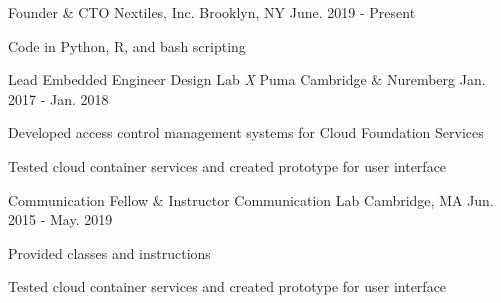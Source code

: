 

\begin{cventries}

\cventry
    {Founder \& CTO} %
    {Nextiles, Inc.} %
    {Brooklyn, NY} %
    {June. 2019 - Present} %
    {
      \begin{cvitems} %
        \item {}
        \item {Code in Python, R, and bash scripting}
      \end{cvitems}
    }

 \cventry
    {Lead Embedded Engineer} %
    {Design Lab \textit{X} Puma} %
    {Cambridge \& Nuremberg} %
    {Jan. 2017 - Jan. 2018} %
    {
      \begin{cvitems} %
        \item {Developed access control management systems for Cloud Foundation Services}
        \item {Tested cloud container services and created prototype for user interface}
      \end{cvitems}
    }

  \cventry
    {Communication Fellow \& Instructor} %
    {Communication Lab} %
    {Cambridge, MA} %
    {Jun. 2015 - May. 2019} %
    {
      \begin{cvitems} %
        \item {Provided classes and instructions}
        \item {Tested cloud container services and created prototype for user interface}
      \end{cvitems}
    }
\end{cventries}
